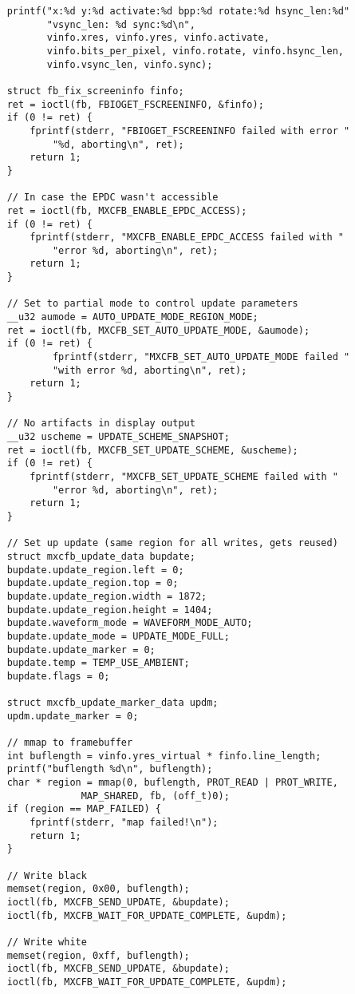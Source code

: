 \documentclass{memoir}
\begin{document}
\begin{verbatim}
	printf("x:%d y:%d activate:%d bpp:%d rotate:%d hsync_len:%d"
	       "vsync_len: %d sync:%d\n",
	       vinfo.xres, vinfo.yres, vinfo.activate,
	       vinfo.bits_per_pixel, vinfo.rotate, vinfo.hsync_len,
	       vinfo.vsync_len, vinfo.sync);

	struct fb_fix_screeninfo finfo;
	ret = ioctl(fb, FBIOGET_FSCREENINFO, &finfo);
	if (0 != ret) {
		fprintf(stderr, "FBIOGET_FSCREENINFO failed with error "
			"%d, aborting\n", ret);
		return 1;
	}

	// In case the EPDC wasn't accessible
	ret = ioctl(fb, MXCFB_ENABLE_EPDC_ACCESS);
	if (0 != ret) {
		fprintf(stderr, "MXCFB_ENABLE_EPDC_ACCESS failed with "
			"error %d, aborting\n", ret);
		return 1;
	}

	// Set to partial mode to control update parameters
	__u32 aumode = AUTO_UPDATE_MODE_REGION_MODE;
	ret = ioctl(fb, MXCFB_SET_AUTO_UPDATE_MODE, &aumode);
	if (0 != ret) {
	        fprintf(stderr, "MXCFB_SET_AUTO_UPDATE_MODE failed "
			"with error %d, aborting\n", ret);
		return 1;
	}

	// No artifacts in display output
	__u32 uscheme = UPDATE_SCHEME_SNAPSHOT;
	ret = ioctl(fb, MXCFB_SET_UPDATE_SCHEME, &uscheme);
	if (0 != ret) {
		fprintf(stderr, "MXCFB_SET_UPDATE_SCHEME failed with "
			"error %d, aborting\n", ret);
		return 1;
	}

	// Set up update (same region for all writes, gets reused)
	struct mxcfb_update_data bupdate;
	bupdate.update_region.left = 0;
	bupdate.update_region.top = 0;
	bupdate.update_region.width = 1872;
	bupdate.update_region.height = 1404;
	bupdate.waveform_mode = WAVEFORM_MODE_AUTO;
	bupdate.update_mode = UPDATE_MODE_FULL;
	bupdate.update_marker = 0;
	bupdate.temp = TEMP_USE_AMBIENT;
	bupdate.flags = 0;
    
	struct mxcfb_update_marker_data updm;
	updm.update_marker = 0;

	// mmap to framebuffer
	int buflength = vinfo.yres_virtual * finfo.line_length;
	printf("buflength %d\n", buflength);
	char * region = mmap(0, buflength, PROT_READ | PROT_WRITE,
			     MAP_SHARED, fb, (off_t)0);
	if (region == MAP_FAILED) {
		fprintf(stderr, "map failed!\n");
		return 1;
	}

	// Write black
	memset(region, 0x00, buflength);
	ioctl(fb, MXCFB_SEND_UPDATE, &bupdate);
	ioctl(fb, MXCFB_WAIT_FOR_UPDATE_COMPLETE, &updm);

	// Write white
	memset(region, 0xff, buflength);
	ioctl(fb, MXCFB_SEND_UPDATE, &bupdate);
	ioctl(fb, MXCFB_WAIT_FOR_UPDATE_COMPLETE, &updm);


\end{verbatim}
\end{document}
